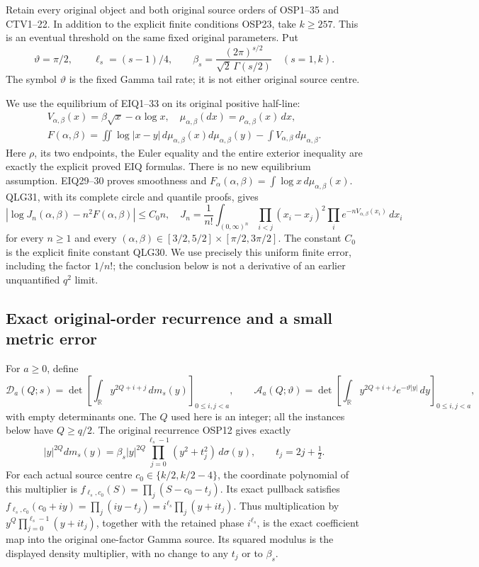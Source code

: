\documentclass[11pt,a4paper]{article}
\begin{document}
Retain every original object and both original source orders of
OSP1--35 and CTV1--22. In addition to the explicit finite conditions
OSP23, take $k\ge257$. This is an eventual threshold on the same
fixed original parameters. Put
\[
\vartheta=\pi/2,\qquad
\ell_s=(s-1)/4,\qquad
\beta_s=\frac{(2\pi)^{s/2}}{\sqrt2\,\Gamma(s/2)}
\quad(s=1,k).
\tag{OFV1}
\]
The symbol $\vartheta$ is the fixed Gamma tail rate; it is not either
original source centre.

We use the equilibrium of EIQ1--33 on its original positive half-line:
\[
\begin{gathered}
V_{\alpha,\beta}(x)=\beta\sqrt{x}-\alpha\log x,\quad
\mu_{\alpha,\beta}(dx)=\rho_{\alpha,\beta}(x)\,dx,\\
F(\alpha,\beta)=
\iint\log|x-y|\,d\mu_{\alpha,\beta}(x)d\mu_{\alpha,\beta}(y)
-\int V_{\alpha,\beta}\,d\mu_{\alpha,\beta}.
\end{gathered}
\tag{OFV2}
\]
Here $\rho$, its two endpoints, the Euler equality and the entire
exterior inequality are exactly the explicit proved EIQ formulas.
There is no new equilibrium assumption. EIQ29--30 proves smoothness
and
$F_\alpha(\alpha,\beta)=\int\log x\,d\mu_{\alpha,\beta}(x)$.
QLG31, with its complete circle and quantile proofs, gives
\[
\left|\log J_n(\alpha,\beta)-n^2F(\alpha,\beta)\right|\le C_0n,
\quad
J_n=\frac1{n!}\int_{(0,\infty)^n}
\prod_{i<j}(x_i-x_j)^2
\prod_i e^{-nV_{\alpha,\beta}(x_i)}\,dx_i
\tag{OFV3}
\]
for every $n\ge1$ and every
$(\alpha,\beta)\in[3/2,5/2]\times[\pi/2,3\pi/2]$.
The constant $C_0$ is the explicit finite constant QLG30.
We use precisely this uniform finite error, including the factor
$1/n!$; the conclusion below is not a derivative of an earlier
unquantified $q^2$ limit.

\subsection{Exact original-order recurrence and a small metric error}

For $a\ge0$, define
\[
\mathcal D_a(Q;s)
=\det\left[\int_{\mathbb R}y^{2Q+i+j}\,dm_s(y)\right]_{0\le i,j<a},
\qquad
\mathcal A_a(Q;\vartheta)
=\det\left[\int_{\mathbb R}y^{2Q+i+j}e^{-\vartheta|y|}\,dy
                                      \right]_{0\le i,j<a},
\tag{OFV4}
\]
with empty determinants one. The $Q$ used here is an integer;
all the instances below have $Q\ge q/2$.
The original recurrence OSP12 gives exactly
\[
|y|^{2Q}dm_s(y)=
\beta_s |y|^{2Q}
\prod_{j=0}^{\ell_s-1}(y^2+t_j^2)\,d\sigma(y),
\qquad t_j=2j+\tfrac12.
\tag{OFV5}
\]
For each actual source centre $c_0\in\{k/2,k/2-4\}$, the
coordinate polynomial of this multiplier is
$f_{\ell_s,c_0}(S)=\prod_j(S-c_0-t_j)$.
Its exact pullback satisfies
$f_{\ell_s,c_0}(c_0+iy)=\prod_j(iy-t_j)
=i^{\ell_s}\prod_j(y+it_j)$.
Thus multiplication by
$y^Q\prod_{j=0}^{\ell_s-1}(y+it_j)$, together with the
retained phase $i^{\ell_s}$, is the exact coefficient map
into the original one-factor Gamma source. Its squared modulus
is the displayed density multiplier, with no change to any $t_j$
or to $\beta_s$.
\end{document}
